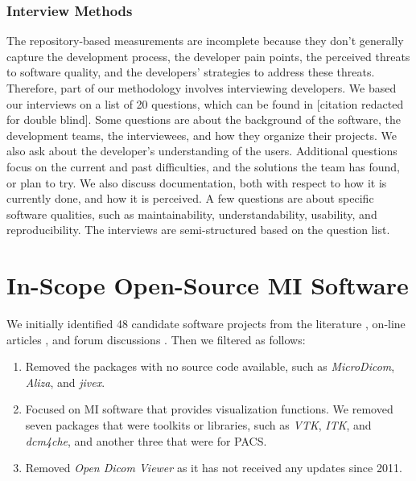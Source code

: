 \documentclass[doubleblind,12pt, 3p, times]{elsarticle}
\begin{document}
\subsubsection{Interview Methods} \label{sec_interview_methods}

The repository-based measurements are incomplete because they don't generally
capture the development process, the developer pain points, the perceived
threats to software quality, and the developers' strategies to address these
threats.  Therefore, part of our methodology involves interviewing developers.
We based our interviews on a list of 20 questions, which can be found in
[citation redacted for double blind].
Some questions are about the background of the software, the development teams,
the interviewees, and how they organize their projects.  We also ask about the
developer's understanding of the users. Additional questions focus on the current and
past difficulties, and the solutions the team has found, or plan to try. We also
discuss documentation, both with respect to how it is currently done, and how it
is perceived. A few questions are about specific software qualities, such as
maintainability, understandability, usability, and reproducibility. The
interviews are semi-structured based on the question list.

\section{In-Scope Open-Source MI Software} \label{SecWhatProjects}

We initially identified 48 candidate software projects from the literature
\cite{Bjorn2017, Bruhschwein2019, Haak2015}, on-line articles \cite{Emms2019,
Hasan2020, Mu2019}, and forum discussions \cite{Samala2014}.  Then we filtered
as follows:

\begin{enumerate}

\item Removed the packages with no source code available, such as
\textit{MicroDicom}, \textit{Aliza}, and \textit{jivex}.

\item Focused on MI software that provides visualization functions.  We removed
seven packages that were toolkits or libraries, such as \textit{VTK},
\textit{ITK}, and \textit{dcm4che}, and another three that were for PACS.

\item Removed \textit{Open Dicom Viewer} as it has not received any
updates since 2011.

\end{enumerate}
\end{document}
